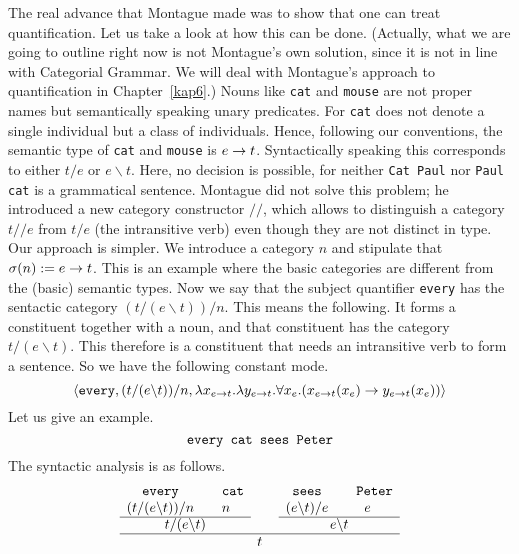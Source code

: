 The real advance that Montague made was to show that one can
treat quantification. Let us take a look at how this can be
done. (Actually, what we are going to outline right now is
not Montague's own solution, since it is not in line with 
Categorial Grammar. 
We will deal with Montague's approach to 
quantification in Chapter~\ref{kap6}.) Nouns like {\tt cat} and 
{\tt mouse} are not proper names but semantically speaking unary predicates.
For {\tt cat} does not denote a single individual but a class of
individuals. Hence, following our conventions, the semantic type
of {\tt cat} and {\tt mouse} is $e \rightarrow t$. Syntactically speaking
this corresponds to either $t/e$ or $e \backslash t$. Here,
no decision is possible, for neither {\tt Cat Paul} nor 
{\tt Paul cat} is a grammatical sentence. Montague did not solve
this problem; he introduced a new category constructor $/\!/$,
which allows to distinguish a category $t /\!/ e$ from $t /e$
(the intransitive verb) even though they are not distinct in type.
Our approach is simpler. We introduce a category $n$ and stipulate
that $\sigma(n) := e \rightarrow t$. This is an example where the basic
categories are different from the (basic) semantic types.
Now we say that the subject quantifier {\tt every} has the
sentactic category $(t/(e \backslash t))/n$. This means the
following. It forms a constituent together with a noun,
and that constituent has the category $t/(e \backslash t)$. 
This therefore is a constituent that needs an intransitive verb 
to form a sentence. So we have the following constant mode.
\begin{equation}
\langle \mbox{\tt every}, (t/(e \backslash t))/n, 
    \lambda x_{e \rightarrow t}. \lambda y_{e \rightarrow t}.
    \forall x_e. (x_{e \rightarrow t}(x_e) \rightarrow y_{e \rightarrow t}(x_e))\rangle
\end{equation}
Let us give an example.
\begin{equation}
\mbox{\tt every cat sees Peter}
\end{equation}
The syntactic analysis is as follows.
\begin{equation}
\begin{array}{ccccc}
\mbox{\tt every} & \quad \mbox{\tt cat} & \quad & \mbox{\tt sees} &
    \quad \mbox{\tt Peter} \\
(t/(e \backslash t))/n & n & & (e \backslash t)/e & e
\\\cline{1-2}\cline{4-5}
\multicolumn{2}{c}{t/(e \backslash t)} & &
    \multicolumn{2}{c}{e \backslash t} \\\hline
    \multicolumn{5}{c}{t}
\end{array}
\end{equation}
